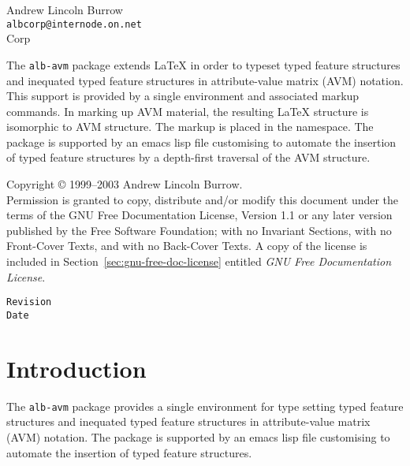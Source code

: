\documentclass[11pt,a4paper,oneside]{article}
\begin{document}


\begin{albTitlePage}


  Andrew Lincoln Burrow\\
  \texttt{albcorp@internode.on.net}\\
  \albLogo{} Corp%


  
  The \texttt{alb-avm} package extends \LaTeX{} in order to typeset
  typed feature structures and inequated typed feature structures in
  attribute-value matrix (AVM) notation.  This support is provided by a
  single environment and associated markup commands.  In marking up AVM
  material, the resulting \LaTeX{} structure is isomorphic to AVM
  structure.  The markup is placed in the \albLogo{} namespace.  The
  package is supported by an emacs lisp file customising \AUCTeX{} to
  automate the insertion of typed feature structures by a depth-first
  traversal of the AVM structure.



  Copyright \copyright{} 1999--2003 Andrew Lincoln Burrow.\\
  Permission is granted to copy, distribute and/or modify this document
  under the terms of the GNU Free Documentation License, Version 1.1 or
  any later version published by the Free Software Foundation; with no
  Invariant Sections, with no Front-Cover Texts, and with no Back-Cover
  Texts.  A copy of the license is included in
  Section~\ref{sec:gnu-free-doc-license} entitled \emph{GNU Free
    Documentation License}.



  \verb$Revision$\\
  \verb$Date$

\end{albTitlePage}




\section{Introduction}
\label{sec:avm-examples:intr}

The \texttt{alb-avm} package provides a single environment for type
setting typed feature structures and inequated typed feature structures
in attribute-value matrix (AVM) notation.  The package is supported by
an emacs lisp file customising \AUCTeX{} to automate the insertion of
typed feature structures.
\end{document}
